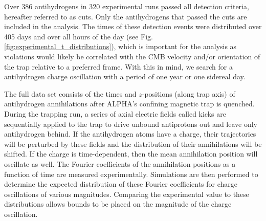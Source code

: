 \documentclass[superscriptaddress,aps,prb,11pt]{revtex4-1}
\begin{document}
Over 386 antihydrogens in 320 experimental runs passed all detection criteria, hereafter referred to as cuts\cite{amol:14a}.  Only the antihydrogens that passed the cuts are included in the analysis.  The times of these detection events were distributed over 405 days and over all hours of the day (see Fig.\ref{fig:experimental_t_distributions}), which is important for the analysis as violations would likely be correlated with the CMB velocity and/or orientation of the trap relative to a preferred frame.  With this in mind, we search for a antihydrogen charge oscillation with a period of one year or one sidereal day.

The full data set consists of the times and $z$-positions (along trap axis) of antihydrogen annihilations after ALPHA's confining magnetic trap is quenched.  During the trapping run, a series of axial electric fields called kicks are sequentially applied to the trap to drive unbound antiprotons out and leave only antihydrogen behind. If the antihydrogen atoms have a charge, their trajectories will be perturbed by these fields and the distribution of their annihilations will be shifted.  If the charge is time-dependent, then the mean annihilation position will oscillate as well.  The Fourier coefficients of the annihilation positions as a function of time are measured experimentally.  Simulations are then performed to determine the expected distribution of these Fourier coefficients for charge oscillations of various magnitudes.  Comparing the experimental value to these distributions allows bounds to be placed on the magnitude of the charge oscillation.
\end{document}
